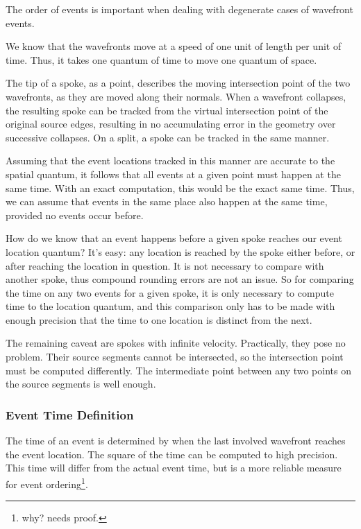 \documentclass[12pt,a4paper,oneside,openany]{article}
\begin{document}
The order of events is important when dealing with degenerate cases of wavefront events.

We know that the wavefronts move at a speed of one unit of length per unit of time. Thus, it takes one quantum of time to move one quantum of space.

The tip of a spoke, as a point, describes the moving intersection point of the two wavefronts, as they are moved along their normals. When a wavefront collapses, the resulting spoke can be tracked from the virtual intersection point of the original source edges, resulting in no accumulating error in the geometry over successive collapses. On a split, a spoke can be tracked in the same manner.

Assuming that the event locations tracked in this manner are accurate to the spatial quantum, it follows that all events at a given point must happen at the same time. With an exact computation, this would be the exact same time. Thus, we can assume that events in the same place also happen at the same time, provided no events occur before.

How do we know that an event happens before a given spoke reaches our event location quantum? It's easy: any location is reached by the spoke either before, or after reaching the location in question. It is not necessary to compare with another spoke, thus compound rounding errors are not an issue. So for comparing the time on any two events for a given spoke, it is only necessary to compute time to the location quantum, and this comparison only has to be made with enough precision that the time to one location is distinct from the next.

The remaining caveat are spokes with infinite velocity. Practically, they pose no problem. Their source segments cannot be intersected, so the intersection point must be computed differently. The intermediate point between any two points on the source segments is well enough.

\subsubsection{Event Time Definition}

The time of an event is determined by when the last involved wavefront reaches the event location. The square of the time can be computed to high precision. This time will differ from the actual event time, but is a more reliable measure for event ordering\footnote{why? needs proof.}.
\end{document}

